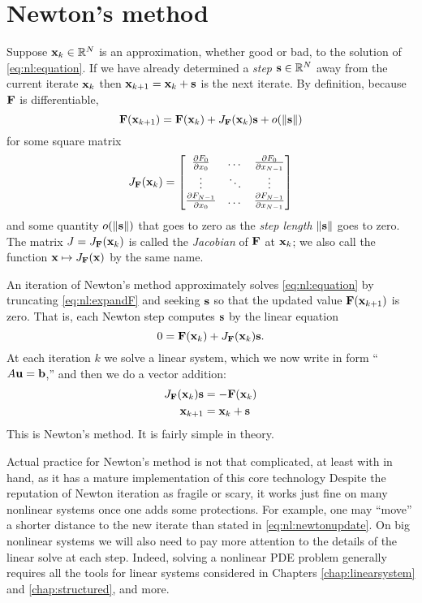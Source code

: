 \section{Newton's method}

Suppose $\mathbf{x}_k\in\mathbb{R}^N$ is an approximation, whether good or bad, to the solution of \eqref{eq:nl:equation}.  If we have already determined a \emph{step} $\mathbf{s}\in\mathbb{R}^N$ away from the current iterate $\mathbf{x}_k$ then $\mathbf{x}_{k+1} = \mathbf{x}_k + \mathbf{s}$ is the next iterate.  By definition, because $\mathbf{F}$ is differentiable,
\begin{equation}
    \mathbf{F}(\mathbf{x}_{k+1}) = \mathbf{F}(\mathbf{x}_k) + J_{\mathbf{F}}(\mathbf{x}_k) \mathbf{s} + o(\|\mathbf{s}\|)  \label{eq:nl:expandF}
\end{equation}
for some square matrix
\begin{equation}
J_{\mathbf{F}}(\mathbf{x}_k) = \begin{bmatrix}
    \frac{\partial F_0}{\partial x_0} & \dots & \frac{\partial F_0}{\partial x_{N-1}} \\
    \vdots & \ddots & \vdots \\
    \frac{\partial F_{N-1}}{\partial x_0} & \dots & \frac{\partial F_{N-1}}{\partial x_{N-1}}  \end{bmatrix}  \label{eq:nl:jacdefn}
\end{equation}
and some quantity $o(\|\mathbf{s}\|)$ that goes to zero as the \emph{step length} $\|\mathbf{s}\|$ goes to zero.  The matrix $J = J_{\mathbf{F}}(\mathbf{x}_k)$ is called the \emph{Jacobian} of $\mathbf{F}$ at $\mathbf{x}_k$; we also call the function $\mathbf{x} \mapsto J_{\mathbf{F}}(\mathbf{x})$ by the same name.

An iteration of Newton's method approximately solves \eqref{eq:nl:equation} by truncating \eqref{eq:nl:expandF} and seeking $\mathbf{s}$ so that the updated value $\mathbf{F}(\mathbf{x}_{k+1})$ is zero.  That is, each Newton step computes $\mathbf{s}$ by the linear equation
\begin{equation}
    0 = \mathbf{F}(\mathbf{x}_k) + J_{\mathbf{F}}(\mathbf{x}_k) \mathbf{s}.
\end{equation}
At each iteration $k$ we solve a linear system, which we now write in form ``$A\mathbf{u}=\mathbf{b}$,'' and then we do a vector addition:
\begin{align}
    J_{\mathbf{F}}(\mathbf{x}_k) \mathbf{s} &= - \mathbf{F}(\mathbf{x}_k)  \label{eq:nl:newtoneq}  \\
    \mathbf{x}_{k+1} &= \mathbf{x}_k + \mathbf{s}  \label{eq:nl:newtonupdate}
\end{align}
This is Newton's method.  It is fairly simple in theory.

Actual practice for Newton's method is not that complicated, at least with \PETSc in hand, as it has a mature implementation of this core technology  Despite the reputation of Newton iteration as fragile or scary, it works just fine on many nonlinear systems once one adds some protections.  For example, one may ``move'' a shorter distance to the new iterate than stated in \eqref{eq:nl:newtonupdate}.  On big nonlinear systems we will also need to pay more attention to the details of the linear solve at each step.  Indeed, solving a nonlinear PDE problem generally requires all the tools for linear systems considered in Chapters \ref{chap:linearsystem} and \ref{chap:structured}, and more.

